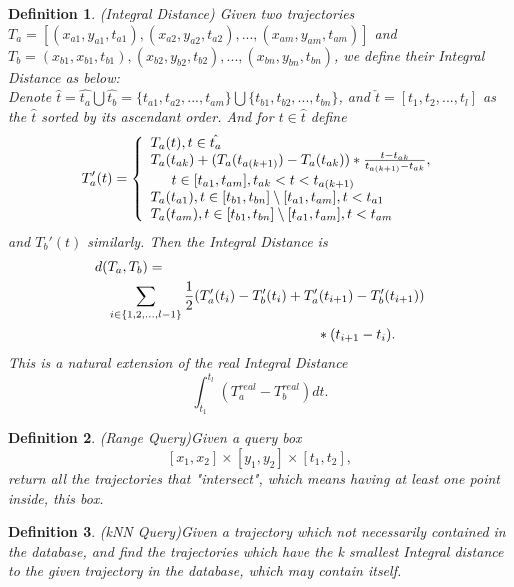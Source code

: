 \documentclass[sigplan]{acmart}
\newtheorem{myDef}{Definition}
\begin{document}
\begin{myDef}
  (Integral Distance) Given two trajectories $T_a=[(x_{a1},y_{a1},t_{a1}), (x_{a2},y_{a2},t_{a2}), ..., (x_{am},y_{am},t_{am})]$ and $T_b=(x_{b1},x_{b1},t_{b1}), (x_{b2}, y_{b2}, t_{b2}), ..., (x_{bn}, y_{bn}, t_{bn})$, we define their Integral Distance as below:\\
  Denote $\hat{t}=\hat{t_a}\bigcup\hat{t_b}=\{t_{a1}, t_{a2}, ..., t_{am}\}\bigcup \{t_{b1}, t_{b2}, ..., t_{bn}\}$, and $\check{t}=[t_1, t_2, ..., t_l]$ as the $\hat{t}$ sorted by its ascendant order. And for $t \in \hat{t}$ define
  $$T_a'(t)=\left\{
             \begin{array}{lr}
             T_a(t), t \in \hat{t_a} \\
             T_a(t_{ak})+ (T_a(t_{a(k+1)})-T_a(t_{ak}))* \frac{t-t_{ak}}{t_{a(k+1)}-t_{ak}}, \\
             \indent  t \in [t_{a1}, t_{am}], t_{ak}<t<t_{a(k+1)} \\
             T_a(t_{a1}), t \in [t_{b1},t_{bn}] \setminus [t_{a1},t_{am}], t< t_{a1} \\
             T_a(t_{am}), t \in [t_{b1},t_{bn}] \setminus [t_{a1},t_{am}], t< t_{am}
             \end{array}
    \right.$$
  and $T_b'(t)$ similarly. Then the Integral Distance is
  $$
  \begin{aligned}
  d(&T_a,T_b)=\\
  &\sum_{i \in \{1, 2, ..., l-1\}} \frac{1}{2} (T_a'(t_i)-T_b'(t_i)+T_a'(t_{i+1})-T_b'(t_{i+1}))\\
  &\indent\indent\indent\indent\indent\indent\indent\indent\indent\indent*(t_{i+1}-t_i).
  \end{aligned}
  $$
  This is a natural extension of the real Integral Distance
  $$\int_{t_1}^{t_l}(T_{a}^{real}-T_{b}^{real})dt.$$
\end{myDef}
\begin{myDef}
  (Range Query)Given a query box $$[x_1,x_2] \times [y_1,y_2] \times [t_1,t_2],$$return all the trajectories that "intersect", which means having at least one point inside, this box.
\end{myDef}
\begin{myDef}
  (kNN Query)Given a trajectory which not necessarily contained in the database, and find the trajectories which have the k smallest Integral distance to the given trajectory in the database, which may contain itself.
\end{myDef}
\end{document}
